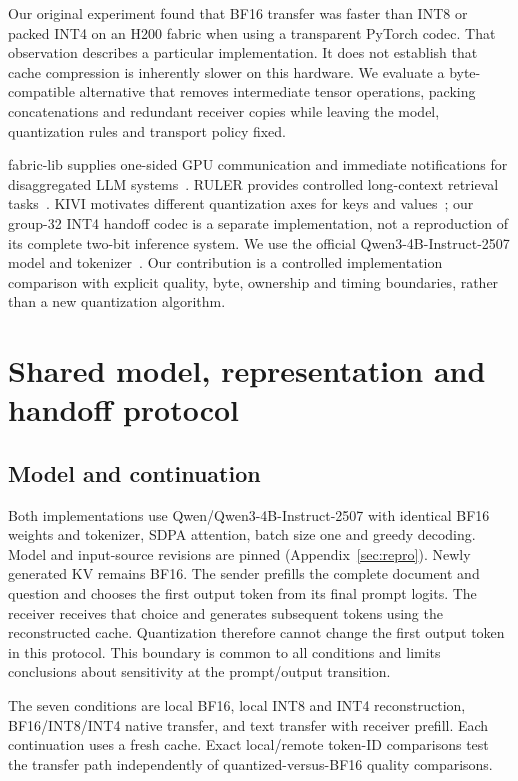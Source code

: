 \documentclass[10pt,twocolumn,letterpaper]{article}
\begin{document}
Our original experiment found that BF16 transfer was faster than INT8 or packed
INT4 on an H200 fabric when using a transparent PyTorch codec. That observation
describes a particular implementation. It does not establish that cache
compression is inherently slower on this hardware. We evaluate a byte-compatible
alternative that removes intermediate tensor operations, packing concatenations
and redundant receiver copies while leaving the model, quantization rules and
transport policy fixed.

fabric-lib supplies one-sided GPU communication and immediate notifications
for disaggregated LLM systems~\cite{fabric}. RULER provides controlled
long-context retrieval tasks~\cite{ruler}. KIVI motivates different quantization
axes for keys and values~\cite{kivi}; our group-32 INT4 handoff codec is a
separate implementation, not a reproduction of its complete two-bit inference
system. We use the official Qwen3-4B-Instruct-2507 model and
tokenizer~\cite{qwen}. Our contribution is a controlled implementation
comparison with explicit quality, byte, ownership and timing boundaries,
rather than a new quantization algorithm.

\section{Shared model, representation and handoff protocol}
\subsection{Model and continuation}
Both implementations use Qwen/Qwen3-4B-Instruct-2507 with identical BF16 weights
and tokenizer, SDPA attention, batch size one and greedy decoding. Model and
input-source revisions are pinned (Appendix~\ref{sec:repro}). Newly generated
KV remains BF16. The sender prefills the complete document and question and
chooses the first output token from its final prompt logits. The receiver
receives that choice and generates subsequent tokens using the reconstructed
cache. Quantization therefore cannot change the first output token in this
protocol. This boundary is common to all conditions and limits conclusions
about sensitivity at the prompt/output transition.

The seven conditions are local BF16, local INT8 and INT4 reconstruction,
BF16/INT8/INT4 native transfer, and text transfer with receiver prefill. Each
continuation uses a fresh cache. Exact local/remote token-ID comparisons test
the transfer path independently of quantized-versus-BF16 quality comparisons.
\end{document}

